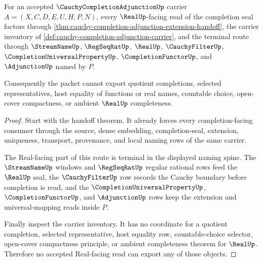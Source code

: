 \begin{theorem}
\label{thm:cauchy-completion-adjunction-real-seal-non-escape}
For an accepted $\CauchyCompletionAdjunctionUp$ carrier $A=(X,C,D,E,U,H,P,N)$, every $\RealUp$-facing read of the completion seal factors through \autoref{thm:cauchy-completion-adjunction-extension-handoff}, the carrier inventory of \autoref{def:cauchy-completion-adjunction-carrier}, and the terminal route through $\StreamNameUp$, $\RegSeqRatUp$, $\RealUp$, $\CauchyFilterUp$, $\CompletionUniversalPropertyUp$, $\CompletionFunctorUp$, and $\AdjunctionUp$ named by $P$.

Consequently the packet cannot export quotient completions, selected representatives, host equality of functions or real names, countable choice, open-cover compactness, or ambient $\RealUp$ completeness.
\end{theorem}
\begin{proof}
Start with the handoff theorem. It already forces every completion-facing consumer through the source, dense embedding, completion-seal, extension, uniqueness, transport, provenance, and local naming rows of the same carrier.

The Real-facing part of this route is terminal in the displayed naming spine. The $\StreamNameUp$ windows and $\RegSeqRatUp$ regular rational rows feed the $\RealUp$ seal, the $\CauchyFilterUp$ row records the Cauchy boundary before completion is read, and the $\CompletionUniversalPropertyUp$, $\CompletionFunctorUp$, and $\AdjunctionUp$ rows keep the extension and universal-mapping reads inside $P$.

Finally inspect the carrier inventory. It has no coordinate for a quotient completion, selected representative, host equality row, countable-choice selector, open-cover compactness principle, or ambient completeness theorem for $\RealUp$. Therefore no accepted Real-facing read can export any of those objects.
\end{proof}

